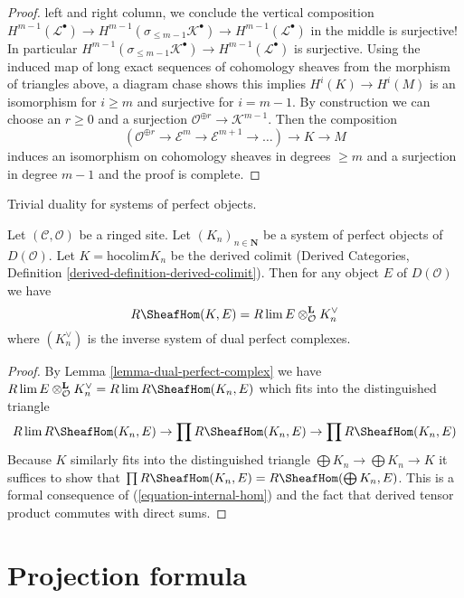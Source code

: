 \begin{proof}
left and right column, we conclude the vertical composition
$H^{m - 1}(\mathcal{L}^\bullet) \to
H^{m - 1}(\sigma_{\leq m - 1}\mathcal{K}^\bullet) \to
H^{m - 1}(\mathcal{L}^\bullet)$ in the middle is surjective!
In particular $H^{m - 1}(\sigma_{\leq m - 1}\mathcal{K}^\bullet) \to
H^{m - 1}(\mathcal{L}^\bullet)$ is surjective.
Using the induced map of long exact sequences of cohomology
sheaves from the morphism of triangles above, a diagram chase
shows this implies $H^i(K) \to H^i(M)$ is an isomorphism
for $i \geq m$ and surjective for $i = m - 1$.
By construction we can choose an $r \geq 0$ and a surjection
$\mathcal{O}^{\oplus r} \to \mathcal{K}^{m - 1}$. Then the
composition
$$
(\mathcal{O}^{\oplus r} \to \mathcal{E}^m \to
\mathcal{E}^{m + 1} \to \ldots ) \longrightarrow
K \longrightarrow M
$$
induces an isomorphism on cohomology sheaves in degrees $\geq m$ and
a surjection in degree $m - 1$ and the proof is complete.
\end{proof}

\begin{lemma}
\label{lemma-colim-and-lim-of-duals}
\begin{slogan}
Trivial duality for systems of perfect objects.
\end{slogan}
Let $(\mathcal{C}, \mathcal{O})$ be a ringed site. Let
$(K_n)_{n \in \mathbf{N}}$ be a system of perfect objects of $D(\mathcal{O})$.
Let $K = \text{hocolim} K_n$ be the derived colimit
(Derived Categories, Definition \ref{derived-definition-derived-colimit}).
Then for any object $E$ of $D(\mathcal{O})$ we have
$$
R\SheafHom(K, E) = R\lim E \otimes^\mathbf{L}_\mathcal{O} K_n^\vee
$$
where $(K_n^\vee)$ is the inverse system of dual perfect complexes.
\end{lemma}

\begin{proof}
By Lemma \ref{lemma-dual-perfect-complex} we have
$R\lim E \otimes^\mathbf{L}_\mathcal{O} K_n^\vee =
R\lim R\SheafHom(K_n, E)$
which fits into the distinguished triangle
$$
R\lim R\SheafHom(K_n, E) \to
\prod R\SheafHom(K_n, E) \to
\prod R\SheafHom(K_n, E)
$$
Because $K$ similarly fits into the distinguished triangle
$\bigoplus K_n \to \bigoplus K_n \to K$ it suffices to show that
$\prod R\SheafHom(K_n, E) = R\SheafHom(\bigoplus K_n, E)$.
This is a formal consequence of (\ref{equation-internal-hom})
and the fact that derived tensor product commutes with direct sums.
\end{proof}




\section{Projection formula}
\label{section-projection-formula}

